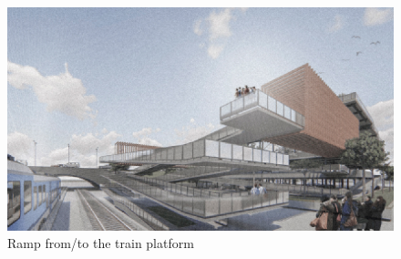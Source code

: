 ﻿%
\begin{figure}[H]
	\centering
	\includegraphics[width=\linewidth]{src/graphics/rawa-buntu-station-2-0--perspective-02.jpg}
	\caption*{
		Ramp from/to the train platform
	}
	\label{
		fig:rawa-buntu-station-2-0--perspective-02
	}
\end{figure}

